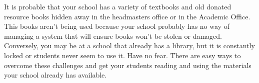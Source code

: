 It is probable that your school has a variety of textbooks and old donated resource books hidden away in the headmasters office or in the Academic Office.  This books aren't being used because your school probably has no way of managing a system that will ensure books won't be stolen or damaged. \\

Conversely, you may be at a school that already has a library, but it is constantly locked or students never seem to use it.  Have no fear.  There are easy ways to overcome these challenges and get your students reading and using the materials your school already has available. \\
\begin{center}
\setlength\fboxsep{0pt}
\setlength\fboxrule{2pt}
\end{center}

